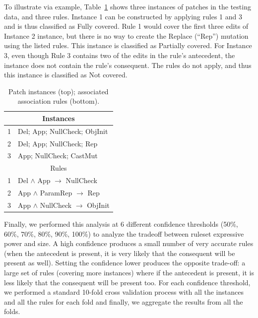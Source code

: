 \documentclass[conference]{IEEEtran}
\begin{document}
To illustrate via example, 
Table~\ref{rulesandinstances} shows three instances of patches in the testing
data, and three rules. Instance 1 can be constructed by
applying rules 1 and 3 and is thus classified as Fully
covered. Rule 1 would cover the first three edits of Instance 2
instance, but there is no way to create the Replace (``Rep'') mutation using the
listed rules.  This instance is classified as Partially covered. For Instance 3,
even though Rule 3 
contains two of the edits in the rule's antecedent, the instance does not
contain the rule's consequent.  The rules do not apply, and thus this instance
is classified as Not covered.

\begin{table}[ht]
  \centering
  \caption{Patch instances (top); associated association rules (bottom). \label{rulesandinstances}}{\small
\begin{tabular}{ll}
\toprule
\multicolumn{2}{c}{Instances} \\
\midrule
1 & Del; App; NullCheck; ObjInit \\
2 & Del; App; NullCheck; Rep \\
3 & App; NullCheck; CastMut \\  
\midrule
 \multicolumn{2}{c}{Rules} \\                     
\midrule
1 & Del $\wedge$ App $\rightarrow$ NullCheck \\  
2 & App $\wedge$ ParamRep $\rightarrow$ Rep \\   
3 &App $\wedge$ NullCheck $\rightarrow$ ObjInit\\
\bottomrule
\end{tabular}

}
\end{table}

Finally, we performed this analysis at 6 different confidence thresholds
(50\%, 60\%, 70\%, 80\%, 90\%, 100\%) to analyze the tradeoff between ruleset expressive
power and size. A high confidence produces 
a small number of very accurate rules (when the
antecedent is present, it is very likely that the consequent will be present as
well).  Setting the confidence lower produces the opposite trade-off:
a large set of rules (covering more instances) where if the antecedent is
present, it is less likely that 
the consequent will be present too. For each confidence
threshold, we performed a standard 10-fold cross validation process with all the
instances and all the rules for each fold and finally, we aggregate the results
from all the folds.
\end{document}
